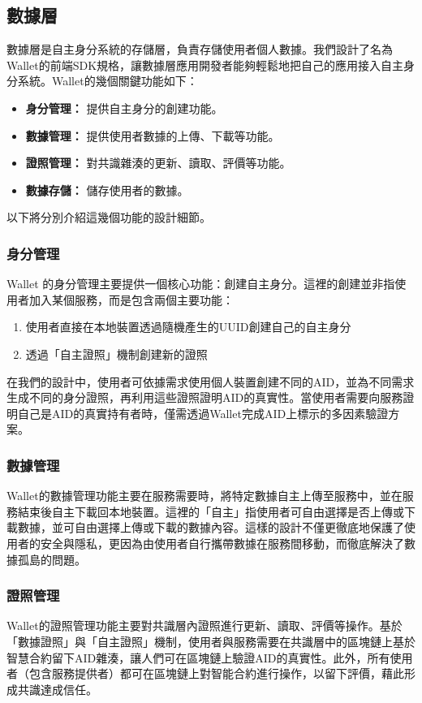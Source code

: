 \subsection{數據層}
數據層是自主身分系統的存儲層，負責存儲使用者個人數據。我們設計了名為Wallet的前端SDK規格，讓數據層應用開發者能夠輕鬆地把自己的應用接入自主身分系統。Wallet的幾個關鍵功能如下：
\begin{itemize}
  \item \textbf{身分管理：} 提供自主身分的創建功能。
  \item \textbf{數據管理：} 提供使用者數據的上傳、下載等功能。
  \item \textbf{證照管理：} 對共識雜湊的更新、讀取、評價等功能。
  \item \textbf{數據存儲：} 儲存使用者的數據。
\end{itemize}
以下將分別介紹這幾個功能的設計細節。
\subsubsection{身分管理}
Wallet 的身分管理主要提供一個核心功能：創建自主身分。這裡的創建並非指使用者加入某個服務，而是包含兩個主要功能：
\begin{enumerate}
  \item 使用者直接在本地裝置透過隨機產生的UUID創建自己的自主身分
  \item 透過「自主證照」機制創建新的證照
\end{enumerate}
在我們的設計中，使用者可依據需求使用個人裝置創建不同的AID，並為不同需求生成不同的身分證照，再利用這些證照證明AID的真實性。當使用者需要向服務證明自己是AID的真實持有者時，僅需透過Wallet完成AID上標示的多因素驗證方案。
\subsubsection{數據管理}
Wallet的數據管理功能主要在服務需要時，將特定數據自主上傳至服務中，並在服務結束後自主下載回本地裝置。這裡的「自主」指使用者可自由選擇是否上傳或下載數據，並可自由選擇上傳或下載的數據內容。這樣的設計不僅更徹底地保護了使用者的安全與隱私，更因為由使用者自行攜帶數據在服務間移動，而徹底解決了數據孤島的問題。
\subsubsection{證照管理}
Wallet的證照管理功能主要對共識層內證照進行更新、讀取、評價等操作。基於「數據證照」與「自主證照」機制，使用者與服務需要在共識層中的區塊鏈上基於智慧合約留下AID雜湊，讓人們可在區塊鏈上驗證AID的真實性。此外，所有使用者（包含服務提供者）都可在區塊鏈上對智能合約進行操作，以留下評價，藉此形成共識達成信任。

